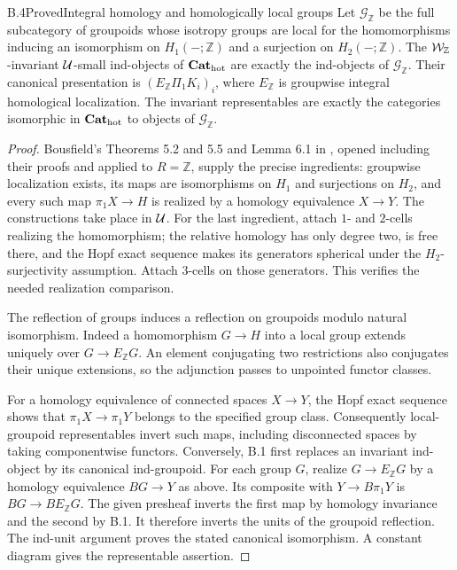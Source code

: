 \begin{claim}{B.4}{Proved}{Integral homology and homologically local groups}
Let $\mathcal G_{\mathbb Z}$ be the full subcategory of groupoids whose isotropy groups are local for the homomorphisms inducing an isomorphism on $H_1(-;\mathbb Z)$ and a surjection on $H_2(-;\mathbb Z)$. The $\mathcal W_{\mathbb Z}$-invariant $\mathcal U$-small ind-objects of ${\mathbf{Cat}_{\mathrm{hot}}}$ are exactly the ind-objects of $\mathcal G_{\mathbb Z}$. Their canonical presentation is $(E_{\mathbb Z}\Pi_1K_i)_i$, where $E_{\mathbb Z}$ is groupwise integral homological localization. The invariant representables are exactly the categories isomorphic in ${\mathbf{Cat}_{\mathrm{hot}}}$ to objects of $\mathcal G_{\mathbb Z}$.
\end{claim}
\begin{proof}
Bousfield's Theorems 5.2 and 5.5 and Lemma 6.1 in \citet{Bousfield1975}, opened including their proofs and applied to $R=\mathbb Z$, supply the precise ingredients: groupwise localization exists, its maps are isomorphisms on $H_1$ and surjections on $H_2$, and every such map $\pi_1X\to H$ is realized by a homology equivalence $X\to Y$. The constructions take place in $\mathcal U$. For the last ingredient, attach $1$- and $2$-cells realizing the homomorphism; the relative homology has only degree two, is free there, and the Hopf exact sequence makes its generators spherical under the $H_2$-surjectivity assumption. Attach $3$-cells on those generators. This verifies the needed realization comparison.

The reflection of groups induces a reflection on groupoids modulo natural isomorphism. Indeed a homomorphism $G\to H$ into a local group extends uniquely over $G\to E_{\mathbb Z}G$. An element conjugating two restrictions also conjugates their unique extensions, so the adjunction passes to unpointed functor classes.

For a homology equivalence of connected spaces $X\to Y$, the Hopf exact sequence shows that $\pi_1X\to\pi_1Y$ belongs to the specified group class. Consequently local-groupoid representables invert such maps, including disconnected spaces by taking componentwise functors. Conversely, B.1 first replaces an invariant ind-object by its canonical ind-groupoid. For each group $G$, realize $G\to E_{\mathbb Z}G$ by a homology equivalence $BG\to Y$ as above. Its composite with $Y\to B\pi_1Y$ is $BG\to BE_{\mathbb Z}G$. The given presheaf inverts the first map by homology invariance and the second by B.1. It therefore inverts the units of the groupoid reflection. The ind-unit argument proves the stated canonical isomorphism. A constant diagram gives the representable assertion.
\end{proof}

